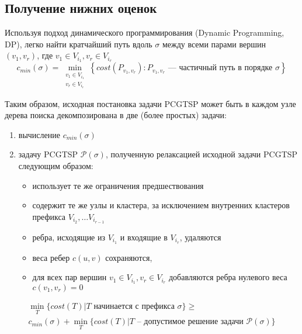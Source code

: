 
\subsection{Получение нижних оценок}
\label{sec:pgstcp.bound}

Используя подход динамического программирования
(Dynamic Programming, DP),
легко найти кратчайший путь
вдоль $\sigma$
между всеми парами вершин
$(v_1, v_r)$,
где
$v_1\in V_{i_1}, v_r\in V_{i_r}$
\begin{equation}
  \label{eq:pcgtsp.Cmin}
  c_{min}(\sigma)=\min_{\substack{v_1\in V_{i_1} \\ v_r\in V_{i_r}} } \left\{
    cost \left(P_{v_1, v_r}\right) \colon
    P_{v_1, v_r} \text{ --- частичный путь в порядке } \sigma \right\}
\end{equation}

Таким образом, исходная постановка задачи PCGTSP
может быть в каждом узле дерева поиска декомпозирована в две
(более простых) задачи:
\begin{enumerate}
  \item вычисление $c_{min}(\sigma)$
  \item задачу PCGTSP $\mathcal P(\sigma)$, полученную релаксацией исходной задачи PCGTSP следующим образом:
  \begin{itemize}
    \item использует те же ограничения предшествования
    \item содержит те же узлы и кластера,
    за исключением внутренних кластеров префикса
    $V_{i_2}, \dots V_{i_{r-1}}$
    \item ребра, исходящие из $V_{i_1}$
    и входящие в $V_{i_r}$, удаляются
    \item веса ребер $c(u,v)$ сохраняются,
    \item для всех пар вершин
    $v_1\in V_{i_1}, v_r\in V_{i_r}$
    добавляются ребра нулевого веса
    $c(v_1, v_r)=0$
  \end{itemize}
\end{enumerate}

\begin{proposition}
\begin{multline}
  \label{eq:pcgtsp.decomposition}
  \min_T \{cost(T)| T \text{ начинается с префикса } \sigma\}
  \geqslant \\
  c_{min}(\sigma) + \min_{T}\{cost(T)| T \text{ -- допустимое решение задачи } \mathcal P(\sigma)\}
\end{multline}
\end{proposition}

